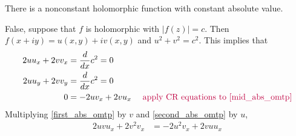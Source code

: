 \documentclass{homework}
\begin{document}
                                                                                                                               \begin{problem}\label{open-mapping-theorem-preview}
                                                                                                                               There is a nonconstant holomorphic function with constant absolute value.
                                                                                                                               \end{problem}
                                                                                                                               \begin{solution}
                                                                                                                               False, suppose that $f$ is holomorphic with $|f(z)| = c$. Then $f(x+iy) = u(x, y) + iv(x, y)$ and $u^2 + v^2 = c^2.$ This implies that 
                                                                                                                               \begin{align}
                                                                                                                               \label{first_abs_omtp} 2uu_x + 2vv_x &= \frac{d}{dx}c^2 = 0\\
                                                                                                                               \label{mid_abs_omtp}2uu_y + 2vv_y &= \frac{d}{dx}c^2 = 0\\
                                                                                                                               \label{second_abs_omtp} 0 &= -2uv_x + 2vu_x \color{purple} \quad\text{ apply CR equations to \ref{mid_abs_omtp}}
                                                                                                                               \end{align}
                                                                                                                               Multiplying \ref{first_abs_omtp} by $v$ and \ref{second_abs_omtp} by $u$,
                                                                                                                               \begin{align*}
                                                                                                                               2uvu_x + 2v^2v_x &= -2u^2v_x + 2vuu_x\\

\end{align*}
\end{solution}
\end{document}

